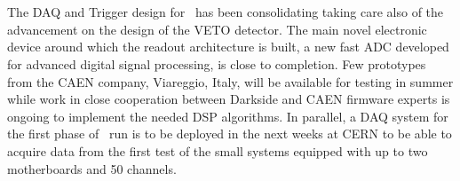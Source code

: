 \section{\DAQ}
\label{sec:DAQ}



The DAQ and Trigger design for \DSk\ has been consolidating taking
care also of the advancement on the design of the VETO detector. The
main novel electronic device around which the readout architecture is built,
a new fast ADC developed for advanced digital signal processing, is close
to completion. Few prototypes from the CAEN company, Viareggio, Italy,  will be available for testing
in summer while work in close cooperation between Darkside and CAEN firmware
experts is ongoing to implement the needed DSP algorithms.
In parallel, a DAQ system for the first phase of \DSp\ run is
to be deployed in the next weeks at CERN to be able to acquire data
from the first test of the small systems equipped with up to two motherboards
and 50 channels.